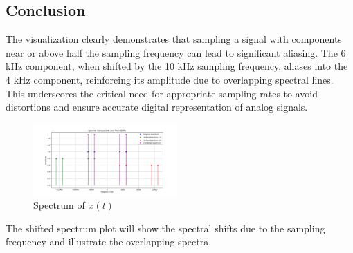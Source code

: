 \subsection{Conclusion}
The visualization clearly demonstrates that sampling a signal with components near or above half the sampling frequency can lead to significant aliasing. The 6 kHz component, when shifted by the 10 kHz sampling frequency, aliases into the 4 kHz component, reinforcing its amplitude due to overlapping spectral lines. This underscores the critical need for appropriate sampling rates to avoid distortions and ensure accurate digital representation of analog signals.

\begin{figure}[h]
    \centering
    \includegraphics[width=0.49\textwidth]{fig/ex1_b_plot}
    \caption{Spectrum of \(x(t)\)}
    \label{fig:ex1_b_plot}
\end{figure}

The shifted spectrum plot will show the spectral shifts due to the sampling frequency and illustrate the overlapping spectra.